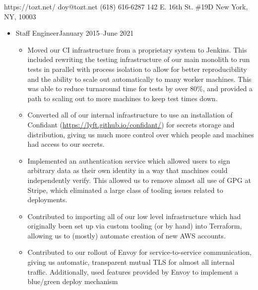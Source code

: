 \documentclass[letterpaper]{article}
\begin{document}
          {https://tozt.net/}
          {doy@tozt.net\hspace{0.5in}}
          {(618) 616-6287}
          {142 E. 16th St. \#19D}
          {New York, NY, 10003}
\begin{itemize}
    \item {}
                        {Staff Engineer}{January 2015--June 2021}
        \begin{itemize}
            \item Moved our CI infrastructure from a proprietary system to
                Jenkins. This included rewriting the testing infrastructure of
                our main monolith to run tests in parallel with process
                isolation to allow for better reproducibility and the ability
                to scale out automatically to many worker machines. This was
                able to reduce turnaround time for tests by over 80\%, and
                provided a path to scaling out to more machines to keep test
                times down.
            \item Converted all of our internal infrastructure to use an
                installation of Confidant
                (\url{https://lyft.github.io/confidant/}) for secrets storage
                and distribution, giving us much more control over which people
                and machines had access to our secrets.
            \item Implemented an authentication service which allowed users to
                sign arbitrary data as their own identity in a way that
                machines could independently verify. This allowed us to remove
                almost all use of GPG at Stripe, which eliminated a large class
                of tooling issues related to deployments.
            \item Contributed to importing all of our low level infrastructure
                which had originally been set up via custom tooling (or by
                hand) into Terraform, allowing us to (mostly) automate creation
                of new AWS accounts.
            \item Contributed to our rollout of Envoy for service-to-service
                communication, giving us automatic, transparent mutual TLS for
                almost all internal traffic. Additionally, used features
                provided by Envoy to implement a blue/green deploy mechanism

\end{itemize}
\end{itemize}
\end{document}
